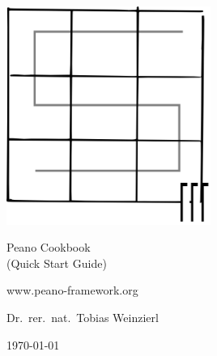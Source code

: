 
\begin{titlepage}

  \begin{center}

    \vspace{8cm}
  
    \includegraphics[width=0.5\textwidth]{logo.png}
 
    \vspace{1.5cm}

    {\Huge
      Peano Cookbook
    }
    \\
    (Quick Start Guide)
   
    \vspace{1cm}

     www.peano-framework.org
     
    \vspace{1.5cm}

     Dr.~rer.~nat.~Tobias Weinzierl
 
    \vspace{1.5cm}

    \today
  \end{center}


\end{titlepage}
